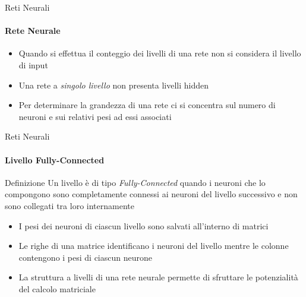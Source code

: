 \documentclass[
 ]{beamer}
\begin{document}
\begin{frame}{Reti Neurali}
    \framesubtitle{Rete Neurale}
    
    \begin{itemize} [<+->]
        \setlength\itemsep{3em}
        \item \large Quando si effettua il conteggio dei livelli di una rete non si considera il livello di input
        \item \large Una rete a \emph{singolo livello} non presenta livelli hidden    
        \item \large Per determinare la grandezza di una rete ci si concentra sul numero di neuroni e sui relativi pesi ad essi associati
    \end{itemize}
\end{frame}

\begin{frame}{Reti Neurali}
    \framesubtitle{Livello Fully-Connected}
    
    \begin{block}{Definizione} 
        \large Un livello è di tipo \emph{Fully-Connected} quando i neuroni che lo compongono sono completamente connessi ai neuroni del livello successivo e non sono collegati tra loro internamente 
    \end{block}\pause
    
    \begin{itemize} [<+->]
        \setlength\itemsep{1.5em}
        \item \large I pesi dei neuroni di ciascun livello sono salvati all'interno di matrici
        \item \large Le righe di una matrice identificano i neuroni del livello mentre le colonne contengono i pesi di ciascun neurone
        \item \large La struttura a livelli di una rete neurale permette di sfruttare le potenzialità del calcolo matriciale 
    \end{itemize}
\end{frame}
\end{document}
